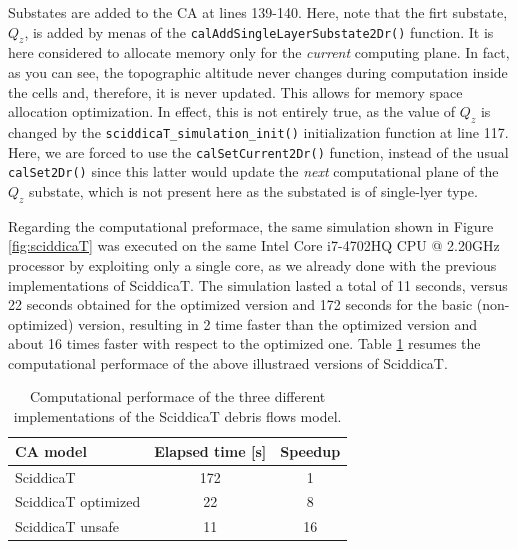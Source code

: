 Substates are added to the CA at lines 139-140. Here, note that the
firt substate, $Q_z$, is added by menas of the
\verb'calAddSingleLayerSubstate2Dr()' function. It is here considered
to allocate memory only for the \emph{current} computing plane. In
fact, as you can see, the topographic altitude never changes during
computation inside the cells and, therefore, it is never updated. This
allows for memory space allocation optimization. In effect, this is
not entirely true, as the value of $Q_z$ is changed by the
\verb'sciddicaT_simulation_init()' initialization function at line
117. Here, we are forced to use the \verb'calSetCurrent2Dr()'
function, instead of the usual \verb'calSet2Dr()' since this latter
would update the \emph{next} computational plane of the $Q_z$
substate, which is not present here as the substated is of single-lyer
type.

Regarding the computational preformace, the same simulation shown in
Figure \ref{fig:sciddicaT} was executed on the same Intel Core
i7-4702HQ CPU @ 2.20GHz processor by exploiting only a single core, as
we already done with the previous implementations of SciddicaT. The
simulation lasted a total of 11 seconds, versus 22 seconds obtained
for the optimized version and 172 seconds for the basic
(non-optimized) version, resulting in 2 time faster than the optimized
version and about 16 times faster with respect to the optimized
one. Table \ref{tab:speedup} resumes the computational performace of
the above illustraed versions of SciddicaT.

\begin{table}
  \centering
  \begin{tabular}{l|c|c}
    \hline
    CA model & Elapsed time [s] & Speedup \\
    \hline
    \hline
    SciddicaT           & 172 & 1\\
    SciddicaT optimized & 22  & 8\\
    SciddicaT unsafe    & 11  & 16\\
    \hline
  \end{tabular}
  \caption{Computational performace of the three different
    implementations of the SciddicaT debris flows model.}
  \label{tab:speedup}
\end{table} 
